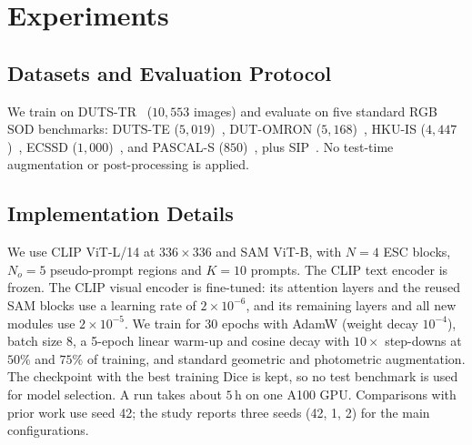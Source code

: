 \section{Experiments}
\label{sec:exp}

\subsection{Datasets and Evaluation Protocol}
\label{sec:datasets}

We train on DUTS-TR~\cite{wang2017duts} ($10{,}553$ images) and evaluate on
five standard RGB SOD benchmarks: DUTS-TE ($5{,}019$)~\cite{wang2017duts},
DUT-OMRON ($5{,}168$)~\cite{yang2013duto}, HKU-IS ($4{,}447$)~\cite{li2015hkuis},
ECSSD ($1{,}000$)~\cite{yan2013ecssd}, and PASCAL-S ($850$)~\cite{li2014pascals},
plus SIP~\cite{fan2019sip}.  No test-time augmentation or
post-processing is applied. 

\subsection{Implementation Details}
\label{sec:impl}

\begin{revpar}
We use CLIP ViT-L/14 at $336{\times}336$ and SAM ViT-B, with $N{=}4$ ESC blocks,
$N_o{=}5$ pseudo-prompt regions and $K{=}10$ prompts. The CLIP text encoder is
frozen. The CLIP visual encoder is fine-tuned: its attention layers and the reused
SAM blocks use a learning rate of $2{\times}10^{-6}$, and its remaining layers and
all new modules use $2{\times}10^{-5}$. We train for $30$ epochs with AdamW (weight
decay $10^{-4}$), batch size $8$, a 5-epoch linear warm-up and cosine decay with
$10{\times}$ step-downs at $50\%$ and $75\%$ of training, and standard geometric
and photometric augmentation. The checkpoint with the best training Dice is kept,
so no test benchmark is used for model selection. A run takes about $5$\,h on one
A100 GPU. Comparisons with prior work use seed 42; the study reports three seeds
(42, 1, 2) for the main configurations.
\end{revpar}

